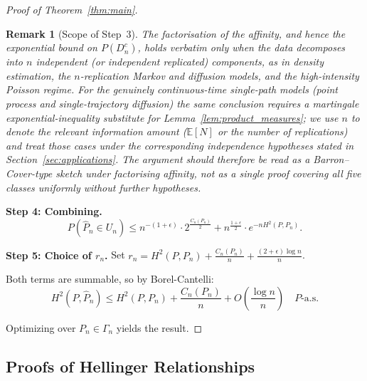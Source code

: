 \documentclass[preprint,review,12pt]{article}
\newtheorem{remark}[theorem]{Remark}
\begin{document}
\begin{proof}[Proof of Theorem~\ref{thm:main}]
\begin{remark}[Scope of Step~3]\label{rem:step3}
The factorisation of the affinity, and hence the exponential bound on
$P(D_n^c)$, holds verbatim only when the data decomposes into $n$ independent
(or independent replicated) components, as in density estimation, the
$n$-replication Markov and diffusion models, and the high-intensity Poisson
regime. For the genuinely continuous-time single-path models (point process
and single-trajectory diffusion) the same conclusion requires a martingale
exponential-inequality substitute for Lemma~\ref{lem:product_measures}; we use
$n$ to denote the relevant information amount ($\mathbb{E}[N]$ or the number of
replications) and treat those cases under the corresponding independence
hypotheses stated in Section~\ref{sec:applications}. The argument should
therefore be read as a Barron--Cover-type sketch under factorising affinity,
not as a single proof covering all five classes uniformly without further
hypotheses.
\end{remark}

\textbf{Step 4: Combining.}
\[
P(\hat{P}_n \in U_n) \leq n^{-(1+\epsilon)} \cdot 2^{\frac{C_n(P_n)}{2}} 
+ n^{\frac{1+\epsilon}{2}} \cdot e^{-n H^2(P, P_n)}.
\]

\textbf{Step 5: Choice of $r_n$.} Set 
$r_n = H^2(P, P_n) + \frac{C_n(P_n)}{n} + \frac{(2+\epsilon)\log n}{n}$.

Both terms are summable, so by Borel-Cantelli:
\[
H^2(P, \hat{P}_n) \leq H^2(P, P_n) + \frac{C_n(P_n)}{n} + O\left(\frac{\log n}{n}\right) 
\quad P\text{-a.s.}
\]

Optimizing over $P_n \in \Gamma_n$ yields the result.
\end{proof}

\subsection{Proofs of Hellinger Relationships}
\end{document}
